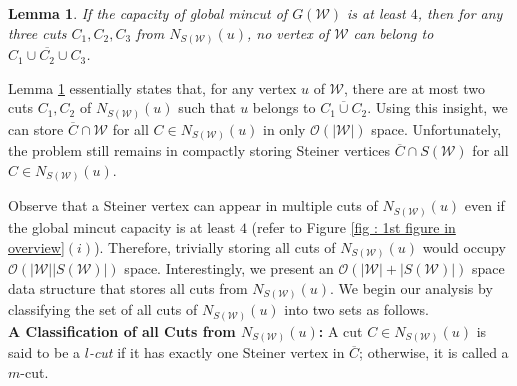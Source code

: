 \documentclass[letterpaper,11pt]{article}
\newtheorem{lemma}{Lemma}[]
\begin{document}
\begin{lemma} \label{lem : overview : three cuts intersection}
    If the capacity of global mincut of $G({\mathcal W})$ is at least $4$, then for any three cuts $C_1,C_2,C_3$ from $N_{S({\mathcal W})}(u)$, no vertex of ${\mathcal W}$ can belong to $\overline{C_1\cup C_2\cup C_3}$.
\end{lemma}
\noindent
Lemma \ref{lem : overview : three cuts intersection} essentially states that, for any vertex $u$ of ${\mathcal W}$, there are at most two cuts $C_1,C_2$ of $N_{S({\mathcal W})}(u)$ such that $u$ belongs to $\overline{C_1\cup C_2}$. Using this insight, we can store $\overline{C}\cap {\mathcal W}$ for all $C\in N_{S({\mathcal W})}(u)$ in only ${\mathcal O}(|{\mathcal W}|)$ space. Unfortunately, the problem still remains in compactly storing Steiner vertices $\overline{C}\cap S({\mathcal W})$ for all $C\in N_{S({\mathcal W})}(u)$. 


Observe that a Steiner vertex can appear in multiple cuts of $N_{S({\mathcal W})}(u)$ even if the global mincut capacity is at least $4$ (refer to Figure \ref{fig : 1st figure in overview}$(i)$). Therefore, trivially storing all cuts of $N_{S({\mathcal W})}(u)$ would occupy ${\mathcal O}(|{\mathcal W}||S({\mathcal W})|)$ space. Interestingly, we present an ${\mathcal O}(|{\mathcal W}|+|S({\mathcal W})|)$ space data structure that stores all cuts from $N_{S({\mathcal W})}(u)$.
We begin our analysis by classifying the set of all cuts of $N_{S({\mathcal W})}(u)$ into two sets as follows.\\

\noindent
\textbf{A Classification of all Cuts from $N_{S({\mathcal W})}(u)$:} A cut $C\in N_{S({\mathcal W})}(u)$ is said to be a \textit{$l$-cut} if it has exactly one Steiner vertex in $\overline{C}$; otherwise, it is called a $m$-cut.\\
\end{document}
